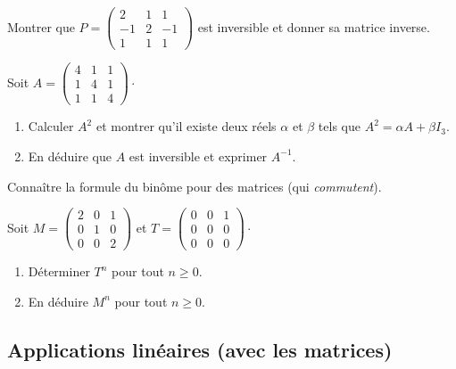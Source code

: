 \documentclass[a4paper,twoside,french,11pt]{VcCours}
\begin{document}
\begin{Exercice}{}
  Montrer que $P = \begin{pmatrix}
    2 & 1 & 1 \\
    -1 & 2 & -1 \\
    1 & 1 & 1
  \end{pmatrix}$ est inversible et donner sa matrice inverse.
\end{Exercice} 
  
\begin{Exercice}{}
  
  Soit $A = \begin{pmatrix} 4&1&1\\1&4&1\\1&1&4\end{pmatrix} \cdot$
  \begin{enumerate}
    \item Calculer $A^2$ et montrer qu'il existe deux réels $\alpha$ et $\beta$ tels que $A^2 = \alpha A + \beta I_3$.
    \item En déduire que $A$ est inversible et exprimer $A^{-1}$.
  \end{enumerate}
\end{Exercice} 
  
\begin{ptc}{}
	Connaître la formule du binôme pour des matrices (qui \textit{commutent}).
\end{ptc}

\begin{Exercice}{}
  Soit $M = \begin{pmatrix}
    2 & 0 & 1 \\
    0 & 1 & 0 \\
    0 & 0 & 2
  \end{pmatrix}$ et $T= \begin{pmatrix}
    0 & 0 & 1 \\
    0 & 0 & 0 \\
    0 & 0 & 0
  \end{pmatrix}\cdot$
  
  \begin{enumerate}
    \item Déterminer $T^n$ pour tout $n \geq 0$.
    \item En déduire $M^n$ pour tout $n \geq 0$.
  \end{enumerate}
\end{Exercice} 

\subsection{Applications linéaires (avec les matrices)}
\end{document}
